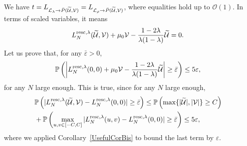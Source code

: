 \documentclass[12pt,a4paper]{article}
\numberwithin{equation}{section}
\newcommand{\Or}{\mathcal{O}}
\newcommand{\Pb}{\mathbb{P}}
\newcommand{\e}{\varepsilon}
\begin{document}
We have $t=L_{{\cal L}_\lambda\to \bar P(\widetilde {\cal U},{\cal V})} =L_{{\cal L}_\rho\to \bar P(\widetilde {\cal U},{\cal V})}$, where equalities hold up to $\Or(1)$.
In terms of scaled variables, it means
\begin{equation}
L^{{\rm resc},\lambda}_N(\widetilde {\cal U},{\cal V})+\mu_0 {\cal V}-\frac{1-2\lambda}{\lambda(1-\lambda)}\widetilde {\cal U}=0.
\end{equation}
Let us prove that, for any $\bar\e>0$,
\begin{equation}\label{eq5.29}
\Pb\left(\left|L^{{\rm resc},\lambda}_N(0,0)+\mu_0{\cal V}-\frac{1-2\lambda}{\lambda(1-\lambda)}\widetilde {\cal U}\right|\geq \bar\e\right)\leq 5\e,
\end{equation}
for any $N$ large enough. This is true, since for any $N$ large enough,
\begin{equation}
\begin{aligned}
&\Pb\left(|L^{{\rm resc},\lambda}_N(\widetilde {\cal U},{\cal V})-L^{{\rm resc},\lambda}_N(0,0)|\geq \bar\e\right)\leq \Pb\left(\max\{|\widetilde{\mathcal{U}}|, |\mathcal{V}|\}\geq C\right)\\
&+\Pb\left(\max_{u,v\in[-C,C]}|L^{{\rm resc},\lambda}_N(u,v)-L^{{\rm resc},\lambda}_N(0,0)|\geq \bar\e\right)\leq 5\e,
\end{aligned}
\end{equation}
where we applied Corollary~\ref{UsefulCorBis} to bound the last term by $\e$.
\end{document}
